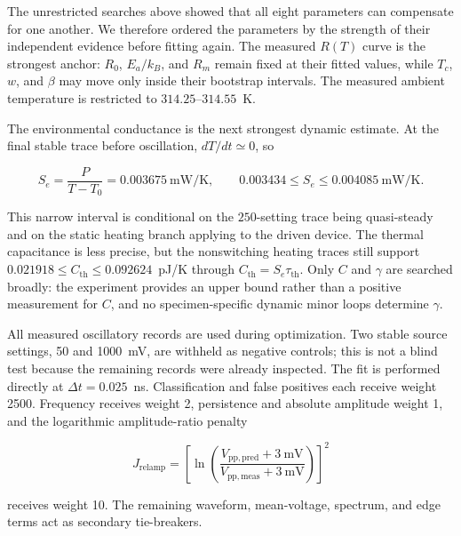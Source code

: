 \documentclass[11pt]{article}
\begin{document}
The unrestricted searches above showed that all eight parameters can compensate for
one another. We therefore ordered the parameters by the strength of their independent
evidence before fitting again. The measured $R(T)$ curve is the strongest anchor:
$R_0$, $E_a/k_B$, and $R_m$ remain fixed at their fitted values, while $T_c$, $w$,
and $\beta$ may move only inside their bootstrap intervals. The measured ambient
temperature is restricted to $314.25$--$314.55$~K.

The environmental conductance is the next strongest dynamic estimate. At the final
stable trace before oscillation, $dT/dt\simeq0$, so

\begin{equation}
S_e=\frac{P}{T-T_0}=0.003675~\mathrm{mW/K},
\qquad 0.003434\le S_e\le0.004085~\mathrm{mW/K}.
\end{equation}

This narrow interval is conditional on the $250$-setting trace being quasi-steady and
on the static heating branch applying to the driven device. The thermal capacitance
is less precise, but the nonswitching heating traces still support
$0.021918\le C_{\mathrm{th}}\le0.092624$~pJ/K through
$C_{\mathrm{th}}=S_e\tau_{\mathrm{th}}$. Only $C$ and $\gamma$ are searched broadly:
the experiment provides an upper bound rather than a positive measurement for $C$,
and no specimen-specific dynamic minor loops determine $\gamma$.

All measured oscillatory records are used during optimization. Two stable source
settings, 50 and 1000~mV, are withheld as negative controls;
this is not a blind test because the remaining records were already inspected. The
fit is performed directly at $\Delta t=0.025$~ns. Classification and false positives
each receive weight 2500. Frequency receives weight 2, persistence and absolute
amplitude weight 1, and the logarithmic amplitude-ratio penalty

\begin{equation}
J_{\mathrm{relamp}}=
\left[\ln\!\left(\frac{V_{\mathrm{pp,pred}}+3~\mathrm{mV}}
{V_{\mathrm{pp,meas}}+3~\mathrm{mV}}\right)\right]^2
\end{equation}

receives weight 10. The remaining waveform, mean-voltage, spectrum, and edge terms
act as secondary tie-breakers.
\end{document}
